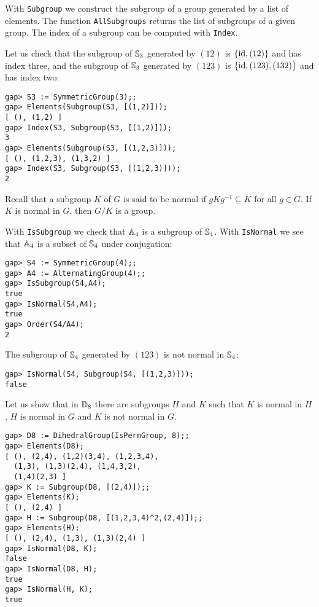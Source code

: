 With \lstinline{Subgroup} we construct the subgroup of a group generated by a
list of elements. The function \lstinline{AllSubgroups} returns the list of
subgroups of a given group. The index of a subgroup can be computed with
\lstinline{Index}.

\begin{example}
Let us check that the subgroup of $\mathbb{S}_3$ generated by $(12)$ is
$\{\operatorname{id},(12)\}$ and has index three, and the subgroup of $\mathbb{S}_3$ generated by
$(123)$ is $\{\operatorname{id},(123),(132)\}$ and has index two: 
\begin{lstlisting}
gap> S3 := SymmetricGroup(3);;
gap> Elements(Subgroup(S3, [(1,2)]));
[ (), (1,2) ]
gap> Index(S3, Subgroup(S3, [(1,2)]));
3
gap> Elements(Subgroup(S3, [(1,2,3)]));
[ (), (1,2,3), (1,3,2) ]
gap> Index(S3, Subgroup(S3, [(1,2,3)]));
2
\end{lstlisting}
\end{example}

Recall that a subgroup $K$ of $G$ is said to be normal if $gKg^{-1}\subseteq K$
for all $g\in G$. If $K$ is normal in $G$, then $G/K$ is a group.

\begin{example}
With \lstinline{IsSubgroup} we check that $\mathbb{A}_4$ is a subgroup of 
$\mathbb{S}_4$. With \lstinline{IsNormal} we see that 
$\mathbb{A}_4$ is a subset of $\mathbb{S}_4$ under conjugation: 
\begin{lstlisting}
gap> S4 := SymmetricGroup(4);;
gap> A4 := AlternatingGroup(4);;
gap> IsSubgroup(S4,A4);
true
gap> IsNormal(S4,A4);
true
gap> Order(S4/A4);
2
\end{lstlisting}
The subgroup of $\mathbb{S}_4$ generated by $(123)$ is not normal in $\mathbb{S}_4$:
\begin{lstlisting}
gap> IsNormal(S4, Subgroup(S4, [(1,2,3)]));
false
\end{lstlisting}
\end{example}

\begin{example}
Let us show that in $\mathbb{D}_8$ there are subgroups $H$ and $K$ such that $K$ is
normal in $H$, $H$ is normal in $G$ and $K$ is not normal in $G$. 
\begin{lstlisting}
gap> D8 := DihedralGroup(IsPermGroup, 8);;
gap> Elements(D8);
[ (), (2,4), (1,2)(3,4), (1,2,3,4), 
  (1,3), (1,3)(2,4), (1,4,3,2), 
  (1,4)(2,3) ]
gap> K := Subgroup(D8, [(2,4)]);;
gap> Elements(K);
[ (), (2,4) ]
gap> H := Subgroup(D8, [(1,2,3,4)^2,(2,4)]);;
gap> Elements(H);
[ (), (2,4), (1,3), (1,3)(2,4) ]
gap> IsNormal(D8, K);
false
gap> IsNormal(D8, H);
true
gap> IsNormal(H, K);
true
\end{lstlisting}
\end{example}

